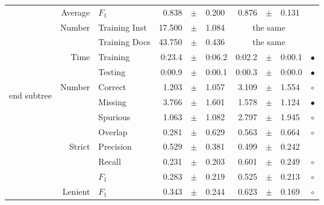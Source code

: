 \begin{longtable}{|r|r|l||rcl|rcl|c|}
\cline{2-10} &                     Average &           $F_1$ &       0.838 &  $\pm$  &       0.200 &       0.876 &  $\pm$  &       0.131 &  \\
\cline{2-10} & \multirow{2}{*}{    Number} &   Training Inst &      17.500 &  $\pm$  &       1.084 &    \multicolumn{3}{c|}{the same}         &  \\
\cline{3-10} &                             &   Training Docs &      43.750 &  $\pm$  &       0.436 &    \multicolumn{3}{c|}{the same}         &  \\
\cline{2-10} & \multirow{2}{*}{      Time} &        Training &      0:23.4 &  $\pm$  &      0:06.2 &      0:02.2 &  $\pm$  &      0:00.1 & $\bullet$ \\
\cline{3-10} &                             &         Testing &      0:00.9 &  $\pm$  &      0:00.1 &      0:00.3 &  $\pm$  &      0:00.0 & $\bullet$ \\
\hline
\hline
\multirow{11}{*}{\begin{sideways}end subtree\end{sideways} }
             & \multirow{4}{*}{    Number} &         Correct &       1.203 &  $\pm$  &       1.057 &       3.109 &  $\pm$  &       1.554 & $\circ$ \\
\cline{3-10} &                             &         Missing &       3.766 &  $\pm$  &       1.601 &       1.578 &  $\pm$  &       1.124 & $\bullet$ \\
\cline{3-10} &                             &        Spurious &       1.063 &  $\pm$  &       1.082 &       2.797 &  $\pm$  &       1.945 & $\circ$ \\
\cline{3-10} &                             &         Overlap &       0.281 &  $\pm$  &       0.629 &       0.563 &  $\pm$  &       0.664 & $\circ$ \\
\cline{2-10} & \multirow{3}{*}{    Strict} &       Precision &       0.529 &  $\pm$  &       0.381 &       0.499 &  $\pm$  &       0.242 &  \\
\cline{3-10} &                             &          Recall &       0.231 &  $\pm$  &       0.203 &       0.601 &  $\pm$  &       0.249 & $\circ$ \\
\cline{3-10} &                             &           $F_1$ &       0.283 &  $\pm$  &       0.219 &       0.525 &  $\pm$  &       0.213 & $\circ$ \\
\cline{2-10} &                     Lenient &           $F_1$ &       0.343 &  $\pm$  &       0.244 &       0.623 &  $\pm$  &       0.169 & $\circ$ \\

\end{longtable}
